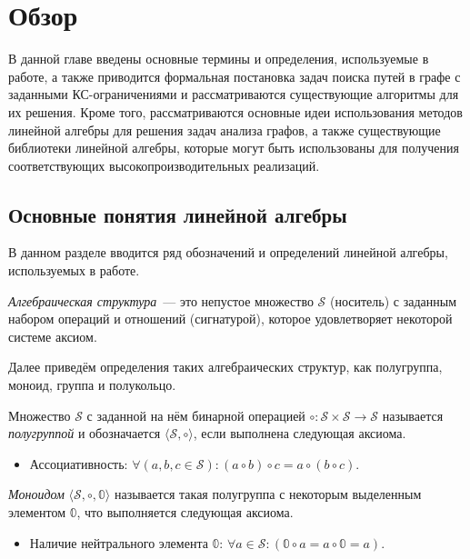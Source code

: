 \chapter{Обзор}\label{ch:ch1}
В данной главе введены основные термины и определения, используемые в работе, а также приводится формальная постановка задач поиска путей в графе с заданными КС-ограничениями и рассматриваются существующие алгоритмы для их решения. Кроме того, рассматриваются основные идеи использования методов линейной алгебры для решения задач анализа графов, а также существующие библиотеки линейной алгебры, которые могут быть использованы для получения соответствующих высокопроизводительных реализаций.

\section{Основные понятия линейной алгебры}\label{sec:ch1/sec1}
В данном разделе вводится ряд обозначений и определений линейной алгебры, используемых в работе.

\begin{definition}
\emph{Алгебраическая структура}~--- это непустое множество $\mathcal{S}$ (носитель) с заданным набором операций и отношений (сигнатурой), которое удовлетворяет некоторой системе аксиом.
\end{definition}

Далее приведём определения таких алгебраических структур, как полугруппа, моноид, группа и полукольцо.

\begin{definition}[Полугруппа]
Множество $\mathcal{S}$ с заданной на нём бинарной операцией $\circ : \mathcal{S} \times \mathcal{S} \to \mathcal{S}$ называется \emph{полугруппой} и обозначается $\langle \mathcal{S}, \circ \rangle$, если выполнена следующая аксиома.
\begin{itemize}
    \item Ассоциативность: $\forall (a, b, c\in \mathcal{S})\colon (a\circ b)\circ c = a\circ (b \circ c)$.
\end{itemize}
\end{definition}

\begin{definition}[Моноид]
	\emph{Моноидом} $\langle \mathcal{S}, \circ, \mathbb{0} \rangle$ называется такая полугруппа с некоторым выделенным элементом $\mathbb{0}$, что выполняется следующая аксиома.
	\begin{itemize}
    \item Наличие нейтрального элемента $\mathbb{0}$: $\forall a\in \mathcal{S}\colon (\mathbb{0} \circ a = a \circ \mathbb{0} = a)$.
    \end{itemize}
\end{definition}

